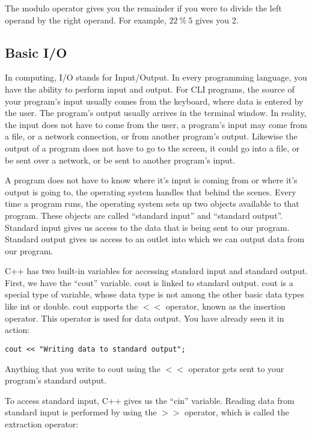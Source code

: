 \documentclass[a4paper,12pt]{article}
\begin{document}
The modulo operator gives you the remainder if you were to divide the left operand by the right operand. For example, $22\ \%\ 5$ gives you 2.

\subsection*{Basic I/O}

In computing, I/O stands for Input/Output. In every programming language, you have the ability to perform input and output. For CLI programs, the source of your program's input usually comes from the keyboard, where data is entered by the user. The program's output usually arrives in the terminal window. In reality, the input does not have to come from the user, a program's input may come from a file, or a network connection, or from another program's output. Likewise the output of a program does not have to go to the screen, it could go into a file, or be sent over a network, or be sent to another program's input.

A program does not have to know where it's input is coming from or where it's output is going to, the operating system handles that behind the scenes. Every time a program runs, the operating system sets up two objects available to that program. These objects are called ``standard input'' and ``standard output''. Standard input gives us access to the data that is being sent to our program. Standard output gives us access to an outlet into which we can output data from our program.

C++ has two built-in variables for accessing standard input and standard output. First, we have the ``cout'' variable. cout is linked to standard output. cout is a special type of variable, whose data type is not among the other basic data types like int or double. cout supports the $<<$ operator, known as the insertion operator. This operator is used for data output. You have already seen it in action:

\begin{lstlisting}
cout << "Writing data to standard output";
\end{lstlisting}

Anything that you write to cout using the $<<$ operator gets sent to your program's standard output.

To access standard input, C++ gives us the ``cin'' variable. Reading data from standard input is performed by using the $>>$ operator, which is called the extraction operator:
\end{document}
